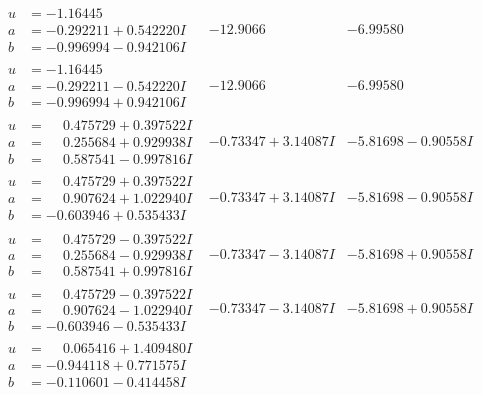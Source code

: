 \documentclass[1p]{elsarticle_modified}
\theoremstyle{definition}
\begin{document}
$$\begin{array}{c|c|c}
\begin{aligned}
u &= -1.16445\phantom{ +0.000000I} \\
a &= -0.292211 + 0.542220 I \\
b &= -0.996994 - 0.942106 I\end{aligned}
 & -12.9066\phantom{ +0.000000I} & -6.99580\phantom{ +0.000000I} \\ \hline\begin{aligned}
u &= -1.16445\phantom{ +0.000000I} \\
a &= -0.292211 - 0.542220 I \\
b &= -0.996994 + 0.942106 I\end{aligned}
 & -12.9066\phantom{ +0.000000I} & -6.99580\phantom{ +0.000000I} \\ \hline\begin{aligned}
u &= \phantom{-}0.475729 + 0.397522 I \\
a &= \phantom{-}0.255684 + 0.929938 I \\
b &= \phantom{-}0.587541 - 0.997816 I\end{aligned}
 & -0.73347 + 3.14087 I & -5.81698 - 0.90558 I \\ \hline\begin{aligned}
u &= \phantom{-}0.475729 + 0.397522 I \\
a &= \phantom{-}0.907624 + 1.022940 I \\
b &= -0.603946 + 0.535433 I\end{aligned}
 & -0.73347 + 3.14087 I & -5.81698 - 0.90558 I \\ \hline\begin{aligned}
u &= \phantom{-}0.475729 - 0.397522 I \\
a &= \phantom{-}0.255684 - 0.929938 I \\
b &= \phantom{-}0.587541 + 0.997816 I\end{aligned}
 & -0.73347 - 3.14087 I & -5.81698 + 0.90558 I \\ \hline\begin{aligned}
u &= \phantom{-}0.475729 - 0.397522 I \\
a &= \phantom{-}0.907624 - 1.022940 I \\
b &= -0.603946 - 0.535433 I\end{aligned}
 & -0.73347 - 3.14087 I & -5.81698 + 0.90558 I \\ \hline\begin{aligned}
u &= \phantom{-}0.065416 + 1.409480 I \\
a &= -0.944118 + 0.771575 I \\
b &= -0.110601 - 0.414458 I\end{aligned}

\end{array}$$
\end{document}
